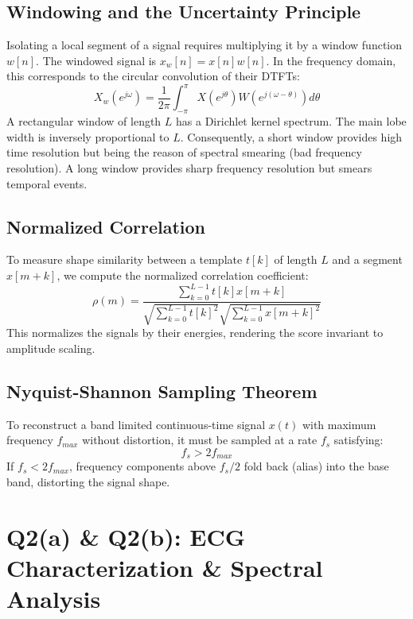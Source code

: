 \documentclass[10pt, a4paper]{article}
\begin{document}
\subsection{Windowing and the Uncertainty Principle}
Isolating a local segment of a signal requires multiplying it by a window function $w[n]$. The windowed signal is $x_w[n] = x[n] w[n]$. In the frequency domain, this corresponds to the circular convolution of their DTFTs:
\begin{equation}
X_w(e^{j\omega}) = \frac{1}{2\pi} \int_{-\pi}^{\pi} X(e^{j\theta}) W(e^{j(\omega - \theta)}) d\theta
\end{equation}
A rectangular window of length $L$ has a Dirichlet kernel spectrum. The main lobe width is inversely proportional to $L$. Consequently, a short window provides high time resolution but being the reason of spectral smearing (bad frequency resolution). A long window provides sharp frequency resolution but smears temporal events.

\subsection{Normalized Correlation}
To measure shape similarity between a template $t[k]$ of length $L$ and a segment $x[m+k]$, we compute the normalized correlation coefficient:
\begin{equation}
\rho(m) = \frac{\sum_{k=0}^{L-1} t[k] x[m+k]}{\sqrt{\sum_{k=0}^{L-1} t[k]^2} \sqrt{\sum_{k=0}^{L-1} x[m+k]^2}}
\end{equation}
This normalizes the signals by their energies, rendering the score invariant to amplitude scaling.

\subsection{Nyquist-Shannon Sampling Theorem}
To reconstruct a band limited continuous-time signal $x(t)$ with maximum frequency $f_{max}$ without distortion, it must be sampled at a rate $f_s$ satisfying:
\begin{equation}
f_s > 2 f_{max}
\end{equation}
If $f_s < 2 f_{max}$, frequency components above $f_s/2$ fold back (alias) into the base band, distorting the signal shape.

\section{Q2(a) \& Q2(b): ECG Characterization \& Spectral Analysis}
\end{document}

